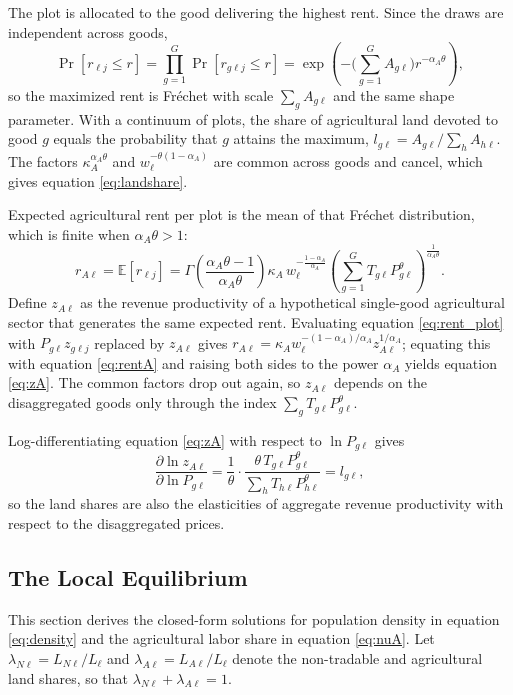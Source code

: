 \documentclass[11pt]{article}
\begin{document}
The plot is allocated to the good delivering the highest rent. Since the draws are independent across goods,
\[
\Pr\!\left[r_{\ell j}\le r\right]=\prod_{g=1}^G \Pr\!\left[r_{g\ell j}\le r\right]
=\exp\!\left(-\Big(\sum_{g=1}^G A_{g\ell}\Big) r^{-\alpha_A\theta}\right),
\]
so the maximized rent is Fr\'echet with scale $\sum_g A_{g\ell}$ and the same shape parameter. With a continuum of plots, the share of agricultural land devoted to good $g$ equals the probability that $g$ attains the maximum, $l_{g\ell}=A_{g\ell}/\sum_h A_{h\ell}$. The factors
$\kappa_A^{\alpha_A\theta}$ and $w_\ell^{-\theta(1-\alpha_A)}$ are common across goods and cancel, which gives equation \eqref{eq:landshare}.


Expected agricultural rent per plot is the mean of that Fr\'echet distribution, which is finite
when $\alpha_A\theta>1$:
\begin{equation}
r_{A\ell}=\mathbb{E}\left[r_{\ell j}\right]
=\Gamma\!\left(\frac{\alpha_A\theta-1}{\alpha_A\theta}\right)
\kappa_A\, w_\ell^{-\frac{1-\alpha_A}{\alpha_A}}
\left(\sum_{g=1}^G T_{g\ell}P_{g\ell}^{\theta}\right)^{\frac{1}{\alpha_A\theta}}.
\label{eq:rentA}
\end{equation}
Define $z_{A\ell}$ as the revenue productivity of a hypothetical single-good agricultural
sector that generates the same expected rent. Evaluating equation \eqref{eq:rent_plot} with
$P_{g\ell}z_{g\ell j}$ replaced by $z_{A\ell}$ gives
$r_{A\ell}=\kappa_A w_\ell^{-(1-\alpha_A)/\alpha_A}z_{A\ell}^{1/\alpha_A}$; equating this with
equation \eqref{eq:rentA} and raising both sides to the power $\alpha_A$ yields equation
\eqref{eq:zA}. The common factors drop out again, so $z_{A\ell}$ depends on the disaggregated
goods only through the index $\sum_g T_{g\ell}P_{g\ell}^\theta$.

Log-differentiating equation \eqref{eq:zA} with respect to $\ln P_{g\ell}$ gives
\[
\frac{\partial \ln z_{A\ell}}{\partial \ln P_{g\ell}}
=\frac{1}{\theta}\cdot
\frac{\theta\,T_{g\ell}P_{g\ell}^{\theta}}{\sum_h T_{h\ell}P_{h\ell}^{\theta}}
=l_{g\ell},
\]
so the land shares are also the elasticities of aggregate revenue productivity with respect to
the disaggregated prices.

\subsection{The Local Equilibrium}
\label{app:localeq}

This section derives the closed-form solutions for population density in equation \eqref{eq:density} and the agricultural labor share in equation \eqref{eq:nuA}. Let $\lambda_{N\ell}=L_{N\ell}/L_\ell$ and $\lambda_{A\ell}=L_{A\ell}/L_\ell$ denote the non-tradable and agricultural land shares, so that $\lambda_{N\ell}+\lambda_{A\ell}=1$.
\end{document}
